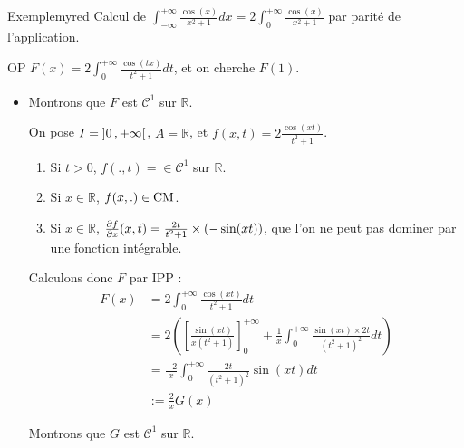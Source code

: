     \begin{omed}{Exemple}{myred}
        Calcul de $\int_{-\infty}^{+\infty} \frac{\cos(x)}{x^2 + 1} dx = 2 \int_{0}^{+\infty} \frac{\cos(x)}{x^2 + 1}$ par parité de l’application. 

        OP $F(x) = 2 \int_{0}^{+\infty} \frac{\cos(tx)}{t^2 + 1} dt$, et on cherche $F(1)$.
        \begin{itemize}
            \item Montrons que $F$ est $\mathcal{C}^1$ sur $\mathbb{R}$. 
            
            On pose $I = \left] 0 \, , +\infty \right[ $, $A = \mathbb{R}$, et $f(x,t) = 2 \frac{\cos(xt)}{t^2 + 1}$. 
            \begin{enumerate}
                \item Si $t > 0$, $f(.,t) = \in \mathcal{C}^1$ sur $\mathbb{R}$.
                \item Si $x \in \mathbb{R}$, $f(x,.) \in \operatorname{CM}$.
                \item Si $x \in \mathbb{R}$, $\frac{\partial f}{\partial x}(x,t) = \frac{2t}{t^2 + 1} \times (-\sin(xt))$, que l’on ne peut pas dominer par une fonction intégrable.
            \end{enumerate}

            Calculons donc $F$ par IPP : 
            \begin{align*}
                F(x) 
                &= 2 \int_{0}^{+\infty} \frac{\cos(xt)}{t^2 + 1} dt \\
                &= 2 \left( \left[\frac{\sin(xt)}{x(t^2 + 1)}\right]_0^{+\infty} + \frac{1}{x} \int_{0}^{+\infty} \frac{\sin(xt) \times 2t}{(t^2 + 1)^2} dt \right) \\
                &= \frac{-2}{x} \int_{0}^{+\infty} \frac{2t}{(t^2 + 1)^2} \sin(xt) dt \\
                &:= \frac{2}{x} G(x)
            \end{align*}

            Montrons que $G$ est $\mathcal{C}^1$ sur $\mathbb{R}$.


\end{itemize}
\end{omed}
